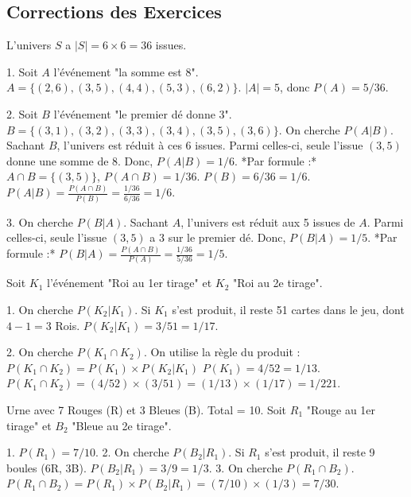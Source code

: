 
\subsection{Corrections des Exercices}


\begin{correctionbox}
L'univers $S$ a $|S| = 6 \times 6 = 36$ issues.

1.  Soit $A$ l'événement "la somme est 8". $A = \{(2,6), (3,5), (4,4), (5,3), (6,2)\}$.
    $|A|=5$, donc $P(A) = 5/36$.

2.  Soit $B$ l'événement "le premier dé donne 3". $B = \{(3,1), (3,2), (3,3), (3,4), (3,5), (3,6)\}$.
    On cherche $P(A|B)$. Sachant $B$, l'univers est réduit à ces 6 issues. Parmi celles-ci, seule l'issue $(3,5)$ donne une somme de 8.
    Donc, $P(A|B) = 1/6$.
    *Par formule :* $A \cap B = \{(3,5)\}$, $P(A \cap B) = 1/36$. $P(B) = 6/36 = 1/6$.
    $P(A|B) = \frac{P(A \cap B)}{P(B)} = \frac{1/36}{6/36} = 1/6$.

3.  On cherche $P(B|A)$. Sachant $A$, l'univers est réduit aux 5 issues de $A$. Parmi celles-ci, seule l'issue $(3,5)$ a 3 sur le premier dé.
    Donc, $P(B|A) = 1/5$.
    *Par formule :* $P(B|A) = \frac{P(A \cap B)}{P(A)} = \frac{1/36}{5/36} = 1/5$.
\end{correctionbox}

\begin{correctionbox}
Soit $K_1$ l'événement "Roi au 1er tirage" et $K_2$ "Roi au 2e tirage".

1.  On cherche $P(K_2|K_1)$. Si $K_1$ s'est produit, il reste 51 cartes dans le jeu, dont $4-1=3$ Rois.
    $P(K_2|K_1) = 3/51 = 1/17$.

2.  On cherche $P(K_1 \cap K_2)$. On utilise la règle du produit :
    $P(K_1 \cap K_2) = P(K_1) \times P(K_2|K_1)$
    $P(K_1) = 4/52 = 1/13$.
    $P(K_1 \cap K_2) = (4/52) \times (3/51) = (1/13) \times (1/17) = 1/221$.
\end{correctionbox}

\begin{correctionbox}
Urne avec 7 Rouges (R) et 3 Bleues (B). Total = 10.
Soit $R_1$ "Rouge au 1er tirage" et $B_2$ "Bleue au 2e tirage".

1.  $P(R_1) = 7/10$.
2.  On cherche $P(B_2|R_1)$. Si $R_1$ s'est produit, il reste 9 boules (6R, 3B).
    $P(B_2|R_1) = 3/9 = 1/3$.
3.  On cherche $P(R_1 \cap B_2)$.
    $P(R_1 \cap B_2) = P(R_1) \times P(B_2|R_1) = (7/10) \times (1/3) = 7/30$.
\end{correctionbox}

